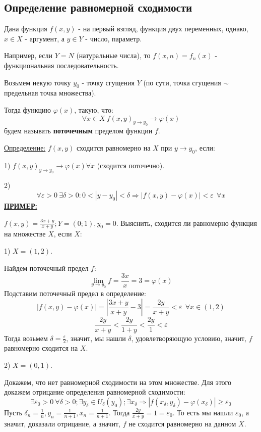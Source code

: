 \documentclass[12pt]{article}
\begin{document}
\subsection{Определение равномерной сходимости}
Дана функция $f(x,y)$ - на первый взгляд, функция двух переменных, однако, $x \in X$ - аргумент, а $y \in Y$ - число, параметр.\par
Например, если $Y = N$ (натуральные числа), то $f (x,n) = f_n (x)$ - функциональная последовательность.\par
Возьмем некую точку $y_0$ - точку сгущения $Y$ (по сути, точка сгущения $\sim$ предельная точка множества).\par
Тогда функцию $\varphi (x)$, такую, что:
$$\forall x \in X \ f(x,y)_{y\to y_0} \to \varphi(x)$$
будем называть \textbf{поточечным} пределом функции $f$.\par
\uline{Определение:}
$f(x,y)$ сходится равномерно на $X$ при $y \to y_0$, если:\par
1) $f(x,y)_{y\to y_0} \to \varphi (x) \forall x$ (сходится поточечно).\par
2) $$\forall \varepsilon > 0 \ \exists \delta > 0 : 0 < |y-y_0| < \delta \Rightarrow |f(x,y) - \varphi(x)|<\varepsilon \ \  \forall x$$
\uline{\textbf{ПРИМЕР:}}\par
$f(x,y) = \frac{3x+y}{x+y}; Y = (0;1), y_0 = 0$. Выяснить, сходится ли равномерно функция на множестве $X$, если $X$:\par
1) $X = (1,2)$.\par
Найдем поточечный предел $f$:
$$\lim_{y\to y_0} f = \frac{3x}{x} = 3 = \varphi(x)$$
Подставим поточечный предел в определение:
$$|f(x,y)-\varphi(x)| = |\frac{3x+y}{x+y} - 3| = \frac{2y}{x+y} < \varepsilon \ \ \forall x \in (1,2)$$
$$\frac{2y}{x+y} < \frac{2y}{1+y} < \frac{2y}{1} < \varepsilon$$
Тогда возьмем $\delta = \frac{\varepsilon}{2}$, значит, мы нашли $\delta$, удовлетворяющую условию, значит, $f$ равномерно сходится на $X$.\par
2) $X = (0,1)$.\par
Докажем, что нет равномерной сходимости на этом множестве. Для этого докажем отрицание определения равномерной сходимости:
$$\exists \varepsilon_0 > 0 \ \forall \delta > 0; \exists y_{\delta} \in U_{\delta} (y_0); \exists x_{\delta} \Rightarrow |f(x_{\delta}, y_{\delta})-\varphi(x_{\delta})| \geq \varepsilon_0$$
Пусть $\delta_n = \frac{1}{n}, y_n = \frac{1}{n+1}, x_n = \frac{1}{n+1}$. Тогда $\frac{2y}{x+y} = 1 = \varepsilon_0$. То есть мы нашли $\varepsilon_0$, а значит, доказали отрицание, а значит, $f$ не сходится равномерно на данном $X$.\par
\end{document}
